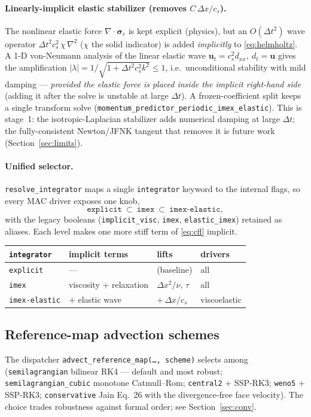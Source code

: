 \documentclass[11pt]{article}
\newcommand{\uv}{\bm{u}}
\begin{document}
\paragraph{Linearly-implicit elastic stabilizer (removes $C\,\Delta x/c_s$).}
The nonlinear elastic force $\nabla\!\cdot\!\bm\sigma_{\!e}$ is kept explicit
(physics), but an $O(\Delta t^2)$ wave operator $\Delta t^2 c_s^2\,\chi\,\nabla^2$
($\chi$ the solid indicator) is added \emph{implicitly} to \eqref{eq:helmholtz}. A
1-D von-Neumann analysis of the linear elastic wave
$\uv_t=c_s^2 d_{xx},\ d_t=\uv$ gives the amplification
$|\lambda|=1/\sqrt{1+\Delta t^2 c_s^2 k^2}\le1$, i.e.\ unconditional stability with
mild damping --- \emph{provided the elastic force is placed inside the implicit
right-hand side} (adding it after the solve is unstable at large $\Delta t$). A
frozen-coefficient split keeps a single transform solve
(\texttt{momentum\_predictor\_periodic\_imex\_elastic}). This is stage~1: the
isotropic-Laplacian stabilizer adds numerical damping at large $\Delta t$; the
fully-consistent Newton/JFNK tangent that removes it is future work
(Section~\ref{sec:limits}).

\paragraph{Unified selector.} \texttt{resolve\_integrator} maps a single
\texttt{integrator} keyword to the internal flags, so every MAC driver exposes one
knob,
\[
\texttt{explicit}\ \subset\ \texttt{imex}\ \subset\ \texttt{imex-elastic},
\]
with the legacy booleans (\texttt{implicit\_visc}, \texttt{imex},
\texttt{elastic\_imex}) retained as aliases. Each level makes one more stiff term of
\eqref{eq:cfl} implicit.

\begin{center}\small
\begin{tabular}{@{}llll@{}}
\hline
\texttt{integrator} & implicit terms & lifts & drivers\\
\hline
\texttt{explicit}     & --- & (baseline) & all\\
\texttt{imex}         & viscosity $+$ relaxation & $\Delta x^2/\nu$, $\tau$ & all\\
\texttt{imex-elastic} & $+$ elastic wave & $+\,\Delta x/c_s$ & viscoelastic\\
\hline
\end{tabular}
\end{center}

\subsection{Reference-map advection schemes}
\label{sec:advect}
The dispatcher \texttt{advect\_reference\_map(\dots, scheme)} selects among
(\texttt{semilagrangian} bilinear RK4 --- default and most robust;
\texttt{semilagrangian\_cubic} monotone Catmull--Rom;
\texttt{central2} $+$ SSP-RK3;
\texttt{weno5} $+$ SSP-RK3;
\texttt{conservative} Jain Eq.~26 with the divergence-free face velocity). The choice
trades robustness against formal order; see Section~\ref{sec:conv}.
\end{document}
